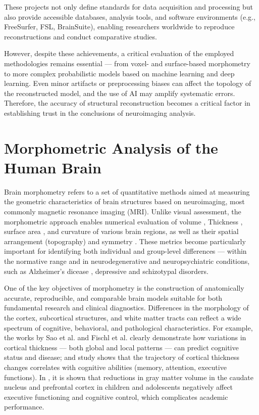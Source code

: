 \documentclass[default]{subfiles}
\begin{document}
These projects not only define standards for data acquisition and processing but also provide accessible databases,
analysis tools, and software environments (e.g., FreeSurfer, FSL, BrainSuite), enabling researchers worldwide to
reproduce reconstructions and conduct comparative studies.

However, despite these achievements, a critical evaluation of the employed methodologies remains essential — from
voxel- and surface-based morphometry to more complex probabilistic models based on machine learning and deep learning.
Even minor artifacts or preprocessing biases can affect the topology of the reconstructed model, and the use of AI may
amplify systematic errors. Therefore, the accuracy of structural reconstruction becomes a critical factor in
establishing trust in the conclusions of neuroimaging analysis.

\section{Morphometric Analysis of the Human Brain}

Brain morphometry refers to a set of quantitative methods aimed at measuring the geometric characteristics of brain
structures based on neuroimaging, most commonly magnetic resonance imaging (MRI). Unlike visual assessment, the
morphometric approach enables numerical evaluation of volume \cite{upadhyay_2014, fischl_2012, wang_2019, makris_2006},
Thickness \cite{upadhyay_2014, fischl_2000, fischl_2012, wang_2019, makris_2006}, surface area
\cite{desikan_2006, fischl_2012, fischl_2004, wang_2019, makris_2006}, and curvature
\cite{fischl_2012, fischl_2000, wang_2019, makris_2006} of various brain regions, as well as their spatial arrangement
(topography) \cite{desikan_2006, fischl_2008, fischl_1999, wang_2019} and symmetry
\cite{desikan_2006, greve_2013, fischl_2004, wang_2019}. These metrics \cite{klein_2017} become particularly
important for identifying both individual and group-level differences — within the normative range and in
neurodegenerative and neuropsychiatric conditions, such as Alzheimer's dicease \cite{he_2024}, depressive
\cite{van_2013} and schizotypal disorders.

One of the key objectives of morphometry is the construction of anatomically accurate, reproducible, and comparable
brain models suitable for both fundamental research and clinical diagnostics. Differences in the morphology of the
cortex, subcortical structures, and white matter tracts can reflect a wide spectrum of cognitive, behavioral, and
pathological characteristics. For example, the works by Sao et al. \cite{cao_2023} and Fischl et al. \cite{fischl_2000}
clearly demonstrate how variations in cortical thickness — both global and local patterns — can predict cognitive
status and disease; and study \cite{shaw_2006} shows that the trajectory of cortical thickness changes correlates with
cognitive abilities (memory, attention, executive functions). In \cite{jagger_2018}, it is shown that reductions in
gray matter volume in the caudate nucleus and prefrontal cortex in children and adolescents negatively affect executive
functioning and cognitive control, which complicates academic performance.
\end{document}
